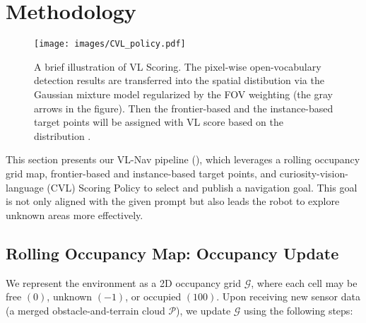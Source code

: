 

\section{Methodology}
\label{sec:method}


\begin{figure*}[h]
    \centering
    \texttt{[image: images/CVL\_policy.pdf]} 
    \captionsetup{
    width=\textwidth,
    font=Smallfont,
    labelfont=Smallfont,
    textfont=Smallfont
    }
    \caption{A brief illustration of VL Scoring. The pixel-wise open-vocabulary detection results are transferred into the spatial distibution via the Gaussian mixture model regularized by the FOV weighting (the gray arrows in the figure). Then the frontier-based and the instance-based target points will be assigned with VL score based on the distribution .}
    \label{fig:CVL}
\end{figure*}

This section presents our VL-Nav pipeline (), which leverages a rolling occupancy grid map, frontier-based and instance-based target points, and curiosity-vision-language (CVL) Scoring Policy to select and publish a navigation goal. This goal is not only aligned with the given prompt but also leads the robot to explore unknown areas more effectively.


\subsection{Rolling Occupancy Map: Occupancy Update}

We represent the environment as a 2D occupancy grid \(\mathcal{G}\), where each cell may be free \((0)\), unknown \((-1)\), or occupied \((100)\). Upon receiving new sensor data (a merged obstacle-and-terrain cloud \(\mathcal{P}\)), we update \(\mathcal{G}\) using the following steps:

